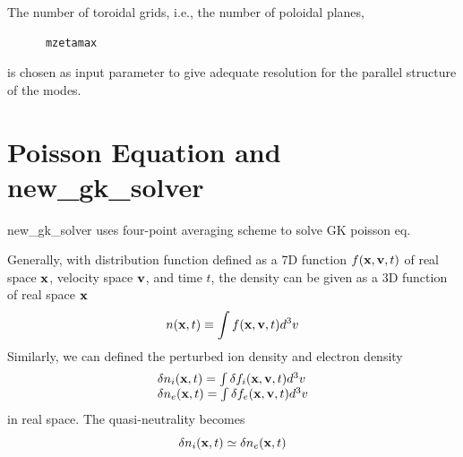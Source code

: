 \documentclass{report}
\newcommand{\ff}[2]{\frac{#1}{#2}}
\newcommand{\pp}[2]{\frac{\partial{#1}}{\partial{#2}}}
\def\A{\mbox{\bf A}}
\def\B{\mbox{\bf B}}
\def\v{\mbox{\bf v}}
\def\x{\mbox{\bf x}}
\begin{document}

The number of toroidal grids, i.e., the number of poloidal planes,

\begin{verbatim}
      mzetamax
\end{verbatim}

\noindent
is chosen as input parameter to give adequate resolution
for the parallel structure of the modes.

\section{Poisson Equation and new\_gk\_solver}
\label{sec:new_gk_solver}
new\_gk\_solver uses four-point averaging scheme to solve GK poisson eq.

Generally, with distribution function defined as a 7D function 
$f(\x, \v, t)$
of real space $\x$, velocity space $\v$, and time $t$, 
the density can be given as a 3D function of real space $\x$
\begin{equation}
\label{eq:density}
n(\x, t) \equiv \int f(\x, \v, t) d^3v
\end{equation}
Similarly, we can defined  the perturbed ion density and electron density
\begin{equation}
\begin{array}{l}
\delta n_i(\x, t) = \int \delta f_i(\x, \v, t) d^3v
\\
\delta n_e(\x, t) = \int \delta f_e(\x, \v, t) d^3v
\end{array}
\end{equation}
in real space.
The quasi-neutrality becomes 
$$\delta n_i(\x, t) \simeq \delta n_e(\x, t)$$
\end{document}
